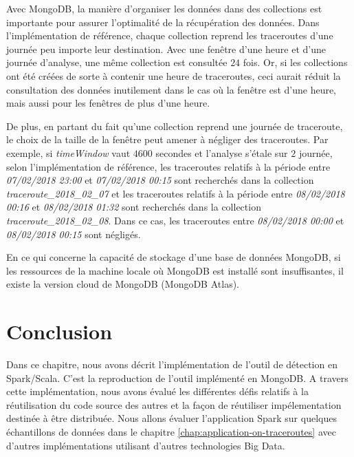 Avec MongoDB,  la manière d'organiser les données dans des collections est importante pour assurer l'optimalité de la récupération des données. Dans l'implémentation de référence, chaque collection reprend les traceroutes d'une journée peu importe leur destination. Avec une fenêtre d'une heure et d'une journée d'analyse,  une même collection est consultée $24$ fois.   Or, si les collections ont été créées de sorte à contenir une heure de traceroutes, ceci aurait réduit la consultation des données inutilement dans le cas où la fenêtre est d'une heure, mais aussi pour les fenêtres de plus d'une heure. 

De plus, en partant du fait qu'une collection reprend une journée de traceroute, le choix de la taille de la fenêtre peut amener à négliger des traceroutes. Par exemple, si \textit{timeWindow} vaut   $ 4600 $ secondes et l'analyse s'étale sur $2$ journée, selon l'implémentation de référence, les traceroutes relatifs à la période entre  \textit{07/02/2018 23:00} et \textit{07/02/2018 00:15}   sont recherchés dans la collection  \textit{traceroute\_2018\_02\_07} et les traceroutes 
relatifs à la période entre \textit{08/02/2018 00:16} et \textit{08/02/2018 01:32}  sont recherchés dans la collection \textit{traceroute\_2018\_02\_08}. Dans ce cas, les traceroutes entre \textit{08/02/2018 00:00} et \textit{08/02/2018 00:15} sont négligés.

En ce qui concerne la capacité de  stockage d'une base de données MongoDB,  si les ressources de la machine locale où MongoDB est installé sont insuffisantes, il existe la version cloud de MongoDB (MongoDB Atlas). 


\section{Conclusion}

Dans ce chapitre, nous avons décrit l'implémentation de l'outil de détection en Spark/Scala.  C'est la reproduction de l'outil implémenté en MongoDB. A travers cette implémentation, nous avons évalué les différentes défis relatifs à la réutilisation du code source des autres et la façon de réutiliser impélementation destinée à être distribuée. Nous allons évaluer l'application Spark sur quelques échantillons de données dans le chapitre \ref{chap:application-on-traceroutes} avec d'autres implémentations utilisant d'autres technologies Big Data. 